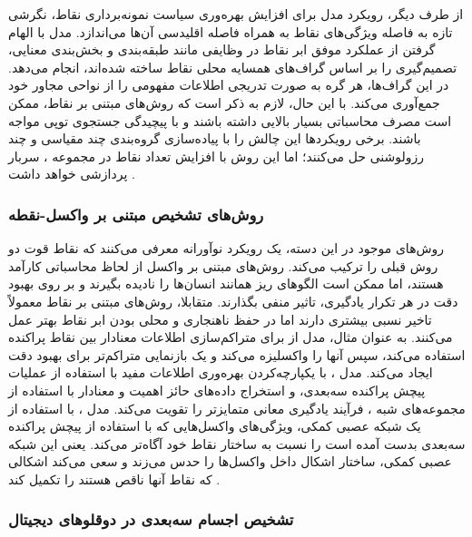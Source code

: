 از طرف دیگر، رویکرد مدل  برای افزایش بهره‌وری سیاست نمونه‌برداری نقاط، نگرشی تازه به فاصله ویژگی‌های نقاط به همراه فاصله اقلیدسی آن‌ها می‌اندازد. مدل  با الهام گرفتن از عملکرد موفق ابر نقاط در وظایفی مانند طبقه‌بندی و بخش‌بندی معنایی، تصمیم‌گیری را بر اساس گراف‌های همسایه محلی نقاط ساخته شده‌اند، انجام می‌دهد. در این گراف‌ها، هر گره به صورت تدریجی اطلاعات مفهومی را از نواحی مجاور خود جمع‌آوری می‌کند. با این حال، لازم به ذکر است که روش‌های مبتنی بر نقاط، ممکن است مصرف محاسباتی بسیار بالایی داشته باشند و با پیچیدگی جستجوی توپی  مواجه باشند. برخی رویکردها این چالش را با پیاده‌سازی گروه‌بندی چند مقیاسی و چند رزولوشنی حل می‌کنند؛ اما این روش با افزایش تعداد نقاط در مجموعه \lr{$\chi$}، سربار پردازشی خواهد داشت \cite{qian20223d}.

\subsubsection{روش‌های تشخیص مبتنی بر واکسل-نقطه}

روش‌های موجود در این دسته، یک رویکرد نوآورانه معرفی می‌کنند که نقاط قوت دو روش قبلی را ترکیب می‌کند. روش‌های مبتنی بر واکسل از لحاظ محاسباتی کارآمد هستند، اما ممکن است الگوهای ریز همانند انسان‌ها را نادیده بگیرند و بر روی بهبود دقت در هر تکرار یادگیری، تاثیر منفی بگذارند. متقابلا، روش‌های مبتنی بر نقاط معمولاً تاخیر نسبی بیشتری دارند اما در حفظ ناهنجاری و محلی بودن ابر نقاط بهتر عمل می‌کنند. به عنوان مثال، مدل  از  برای متراکم‌سازی اطلاعات معنادار بین نقاط پراکنده استفاده می‌کند، سپس آنها را واکسلیزه  می‌‌کند و یک بازنمایی متراکم‌تر برای بهبود دقت ایجاد می‌کند.  مدل ، با یکپارچه‌کردن بهره‌وری اطلاعات مفید با استفاده از عملیات پیچش پراکنده سه‌بعدی، و استخراج داده‌های حائز اهمیت و معنادار با استفاده از مجموعه‌های شبه  ، فرآیند یادگیری معانی متمایزتر را تقویت می‌کند. مدل ، با استفاده از یک شبکه عصبی کمکی، ویژگی‌های واکسل‌هایی که با استفاده از پیچش پراکنده سه‌بعدی بدست آمده است را نسبت به ساختار نقاط خود آگاه‌تر می‌کند. یعنی این شبکه عصبی کمکی، ساختار اشکال داخل واکسل‌ها را حدس می‌زند و سعی می‌کند اشکالی که نقاط آنها ناقص هستند را تکمیل کند \cite{qian20223d}.

\subsubsection{تشخیص اجسام سه‌بعدی در دوقلوهای دیجیتال}

